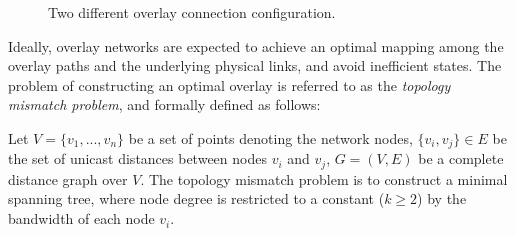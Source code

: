 \documentclass[acmcsur,acmnow]{acmtrans2m}
\begin{document}
\begin{figure}[ht]
\centering
{}\qquad\qquad
{}
\caption{Two different overlay connection configuration.}
\label{figure:overlay-confs}
\end{figure}

Ideally, overlay networks are expected to achieve an optimal mapping among the overlay paths and the underlying physical links, and avoid inefficient states. The problem of constructing an optimal overlay is referred to as the \emph{topology mismatch problem}, and formally defined as follows:
\begin{definition}
    Let $V = \{v_1, ..., v_n\}$ be a set of points denoting the network nodes, $\{v_i, v_j\} \in E$ be the set of unicast distances between nodes $v_i$ and $v_j$, $G=(V,E)$ be a complete distance graph over $V$. The topology mismatch problem is to construct a minimal spanning tree,  where node degree is restricted to a constant ($k\geq 2$) by the bandwidth of each node $v_i$.
\end{definition}
 
\end{document}
